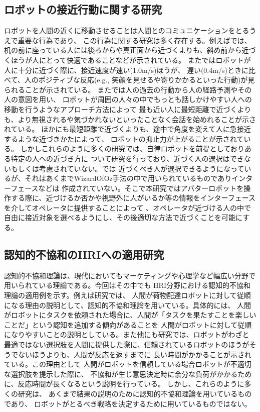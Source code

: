 \documentclass{kuisthesis}
\begin{document}
\subsection{ロボットの接近行動に関する研究}
ロボットを人間の近くに移動させることは人間とのコミュニケーションをとるうえで重要な行為であり、
この行為に関する研究は多く存在する。例えば\cite{woods2006methodological}では、
机の前に座っている人には後ろからや真正面から近づくよりも、斜め前から近づくほうが人にとって快適であることなどが示されている。
また\cite{joosse2021making}ではロボットが人に十分に近づく際に、接近速度が速い(1.0m/s)ほうが、
遅い(0.4m/s)ときに比べて、人のポジティブな反応(e.g., 笑顔を見せるや寄りかかるといった行動)が見られることが示されている。
また\cite{satake2009approach}では人の過去の行動から人の経路予測やその人の意図を用い、
ロボットが周囲の人々の中でもっとも話しかけやすい人への移動を行うようなアプローチ方法によって
最も近い人に最短距離で近づくよりも、より無視されるや気づかれないといったことなく会話を始めれることが示されている。
ほかにも最短距離で近づくよりも、途中で角度を変えて人に急接近するような近づきかたによって、
ロボットの抑止力が上がることが示されている\cite{Mizumaru2019}。
しかしこれらのように多くの研究では、自律ロボットを前提としておりある特定の人への近づき方に
ついて研究を行っており、近づく人の選択はできないもしくは考慮されていない。\cite{Mizumaru2019}では
近づくべき人が選択できるようになっているが、それはあくまでWizardOfOz手法の中で用いられているものでありインターフェースなどは
作成されていない。そこで本研究ではアバターロボットを操作する際に、近づけるか否かや視野外に人がいるか等の情報をインターフェースを介してオペレータに提供することによって
、オペレータが近づける人の中で自由に接近対象を選べるようにし、その後適切な方法で近づくことを可能にする。

\subsection{認知的不協和のHRIへの適用研究}
認知的不協和理論\cite{Festinger1957}は、現代においてもマーケティングや心理学など幅広い分野で用いられている理論である。今回はその中でも
HRI分野における認知的不協和理論の適用例を示す。例えば研究\cite{washburn2022exploring}では、
人間が荷物配達ロボットに対して従順になる理由の説明として、認知的不協和理論を用いている。具体的には、
人間がロボットにタスクを依頼された場合に、人間が「タスクを果たすことを楽しいことだ」という認知を追加する傾向があることを
人間がロボットに対して従順になりやすいことの説明としている。また他にも研究\cite{herse2018you}では、ロボットがわざと
最適ではない選択肢を人間に提供した際に、信頼されているロボットのほうがそうでないほうよりも、人間が反応を返すまでに
長い時間がかかることが示されている。この理由として
人間がロボットを信頼している場合ロボットが不適切な選択肢を提示した際に、
不協和が生じ意思決定時に余分な負荷がかかるために、反応時間が長くなるという説明を行っている。
しかし、これらのように多くの研究は、
あくまで結果の説明のために認知的不協和理論を用いているものであり、
ロボットがとるべき戦略を決定するために用いているものではない。
\end{document}
